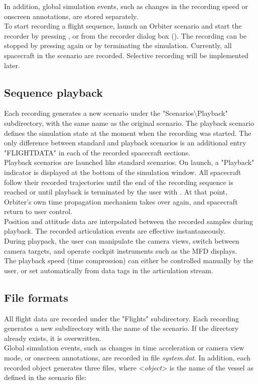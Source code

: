 \documentclass[Orbiter Technical Reference.tex]{subfiles}
\begin{document}
\noindent
In addition, global simulation events, such as changes in the recording speed or onscreen annotations, are stored separately.\\
To start recording a flight sequence, launch an Orbiter scenario and start the recorder by pressing \Ctrl{}, or from the recorder dialog box (\Ctrl{}). The recording can be stopped by pressing \Ctrl{} again or by terminating the simulation. Currently, all spacecraft in the scenario are recorded. Selective recording will be implemented later.


\subsection{Sequence playback}
Each recording generates a new scenario under the "Scenarios\textbackslash Playback" subdirectory, with the same name as the original scenario. The playback scenario defines the simulation state at the moment when the recording was started. The only difference between standard and playback scenarios is an additional entry "FLIGHTDATA" in each of the recorded spacecraft sections.\\
Playback scenarios are launched like standard scenarios. On launch, a "Playback" indicator is displayed at the bottom of the simulation window. All spacecraft follow their recorded trajectories until the end of the recording sequence is reached or until playback is terminated by the user with \Ctrl{}. At that point, Orbiter's own time propagation mechanism takes over again, and spacecraft return to user control.\\
Position and attitude data are interpolated between the recorded samples during playback. The recorded articulation events are effective instantaneously.\\
During playpack, the user can manipulate the camera views, switch between camera targets, and operate cockpit instruments such as the MFD displays.\\
The playback speed (time compression) can either be controlled manually by the user, or set automatically from data tags in the articulation stream.


\subsection{File formats}
All flight data are recorded under the "Flights" subdirectory. Each recording generates a new subdirectory with the name of the scenario. If the directory already exists, it is overwritten.\\
Global simulation events, such as changes in time acceleration or camera view mode, or onscreen annotations, are recorded in file \textit{system.dat}. In addition, each recorded object generates three files, where <\textit{object}> is the name of the vessel as defined in the scenario file:
\end{document}
